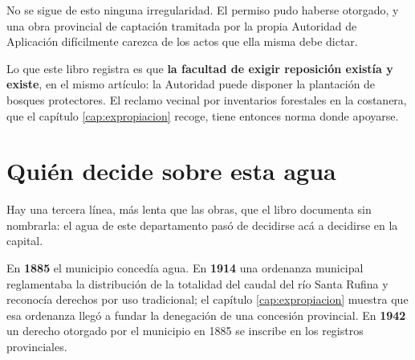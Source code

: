 \begin{cautela}
No se sigue de esto ninguna irregularidad. El permiso pudo haberse otorgado, y una obra
provincial de captación tramitada por la propia Autoridad de Aplicación difícilmente carezca
de los actos que ella misma debe dictar.

Lo que este libro registra es que \textbf{la facultad de exigir reposición existía y existe},
en el mismo artículo: la Autoridad puede disponer la plantación de bosques protectores. El
reclamo vecinal por inventarios forestales en la costanera, que el capítulo
\ref{cap:expropiacion} recoge, tiene entonces norma donde apoyarse.
\end{cautela}

\section{Quién decide sobre esta agua}

Hay una tercera línea, más lenta que las obras, que el libro documenta sin nombrarla: el agua
de este departamento pasó de decidirse acá a decidirse en la capital.

En \textbf{1885} el municipio concedía agua. En \textbf{1914} una ordenanza municipal
reglamentaba la distribución de la totalidad del caudal del río Santa Rufina y reconocía
derechos por uso tradicional; el capítulo \ref{cap:expropiacion} muestra que esa ordenanza
llegó a fundar la denegación de una concesión provincial. En \textbf{1942} un derecho otorgado
por el municipio en 1885 se inscribe en los registros provinciales.

